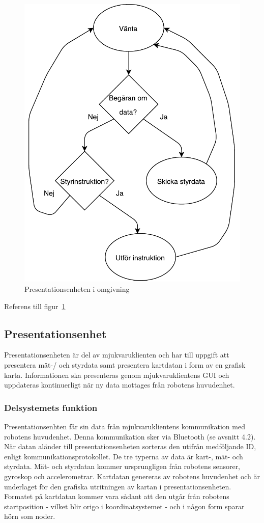 \documentclass{article}
\begin{document}
\begin{figure}[H]
\centering
\includegraphics[scale=0.6]{styrenhet_flowchart}
\caption{Presentationsenheten i omgivning}
\label{fig:styrenhet_flowchart}
\end{figure}
Referens till figur~\ref{fig:styrenhet_flowchart} 
\clearpage

\subsection{Presentationsenhet}
Presentationsenheten är del av mjukvaruklienten och har till uppgift att presentera mät-/ och styrdata samt presentera kartdatan i form av en grafisk karta. Informationen ska presenteras genom mjukvaruklientens GUI och uppdateras kontinuerligt när ny data mottages från robotens huvudenhet. 

\subsubsection{Delsystemets funktion}
Presentationsenhten får sin data från mjukvaruklientens kommunikation med robotens huvudenhet. Denna kommunikation sker via Bluetooth (se avsnitt 4.2). När datan aländer till presentationsenheten sorteras den utifrån medföljande ID, enligt kommunikationsprotokollet. De tre typerna av data är kart-, mät- och styrdata. Mät- och styrdatan kommer ursprungligen från robotens sensorer, gyroskop och accelerometrar. Kartdatan genereras av robotens huvudenhet och är underlaget för den grafiska utritningen av kartan i presentationsenheten. Formatet på kartdatan kommer vara sådant att den utgår från robotens startposition - vilket blir origo i koordinatsystemet - och i någon form sparar hörn som noder. 
\end{document}
